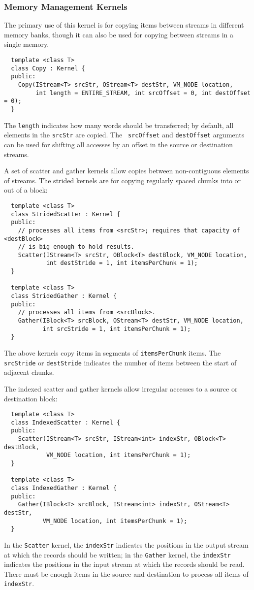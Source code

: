 \subsubsection*{Memory Management Kernels}

 The primary use of this kernel is for copying items
between streams in different memory banks, though it can also be used
for copying between streams in a single memory.
{\small
\begin{verbatim}
  template <class T>
  class Copy : Kernel {
  public:
    Copy(IStream<T> srcStr, OStream<T> destStr, VM_NODE location, 
         int length = ENTIRE_STREAM, int srcOffset = 0, int destOffset = 0);
  }
\end{verbatim}}
The {\tt length} indicates how many words should be transferred; by
default, all elements in the {\tt srcStr} are copied.  The {\tt
srcOffset} and {\tt destOffset} arguments can be used for shifting all
accesses by an offset in the source or destination streams.

 A set of scatter and gather kernels allow copies
between non-contiguous elements of streams.  The strided kernels are
for copying regularly spaced chunks into or out of a block:
{\small
\begin{verbatim}
  template <class T>
  class StridedScatter : Kernel {
  public:
    // processes all items from <srcStr>; requires that capacity of <destBlock>
    // is big enough to hold results.
    Scatter(IStream<T> srcStr, OBlock<T> destBlock, VM_NODE location, 
            int destStride = 1, int itemsPerChunk = 1);
  }

  template <class T>
  class StridedGather : Kernel {
  public:
    // processes all items from <srcBlock>.
    Gather(IBlock<T> srcBlock, OStream<T> destStr, VM_NODE location, 
           int srcStride = 1, int itemsPerChunk = 1);
  }  
\end{verbatim}}
The above kernels copy items in segments of {\tt itemsPerChunk} items.
The {\tt srcStride} or {\tt destStride} indicates the number of items
between the start of adjacent chunks.

The indexed scatter and gather kernels allow irregular accesses to a
source or destination block:
{\small
\begin{verbatim}
  template <class T>
  class IndexedScatter : Kernel {
  public:
    Scatter(IStream<T> srcStr, IStream<int> indexStr, OBlock<T> destBlock, 
            VM_NODE location, int itemsPerChunk = 1);
  }

  template <class T>
  class IndexedGather : Kernel {
  public:
    Gather(IBlock<T> srcBlock, IStream<int> indexStr, OStream<T> destStr,
           VM_NODE location, int itemsPerChunk = 1);
  }  
\end{verbatim}}
In the {\tt Scatter} kernel, the {\tt indexStr} indicates the
positions in the output stream at which the records should be written;
in the {\tt Gather} kernel, the {\tt indexStr} indicates the positions
in the input stream at which the records should be read.  There must
be enough items in the source and destination to process all items of
{\tt indexStr}.

